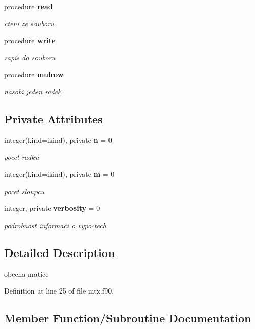 \begin{DoxyCompactItemize}
procedure {\bf read}
\begin{DoxyCompactList}\small\item\em cteni ze souboru \end{DoxyCompactList}\item 
procedure {\bf write}
\begin{DoxyCompactList}\small\item\em zapis do souboru \end{DoxyCompactList}\item 
procedure {\bf mulrow}
\begin{DoxyCompactList}\small\item\em nasobi jeden radek \end{DoxyCompactList}\end{DoxyCompactItemize}
\subsection*{Private Attributes}
\begin{DoxyCompactItemize}
\item 
integer(kind=ikind), private {\bf n} = 0
\begin{DoxyCompactList}\small\item\em pocet radku \end{DoxyCompactList}\item 
integer(kind=ikind), private {\bf m} = 0
\begin{DoxyCompactList}\small\item\em pocet sloupcu \end{DoxyCompactList}\item 
integer, private {\bf verbosity} = 0
\begin{DoxyCompactList}\small\item\em podrobnost informaci o vypoctech \end{DoxyCompactList}\end{DoxyCompactItemize}


\subsection{Detailed Description}
obecna matice 

Definition at line 25 of file mtx.\+f90.



\subsection{Member Function/\+Subroutine Documentation}
